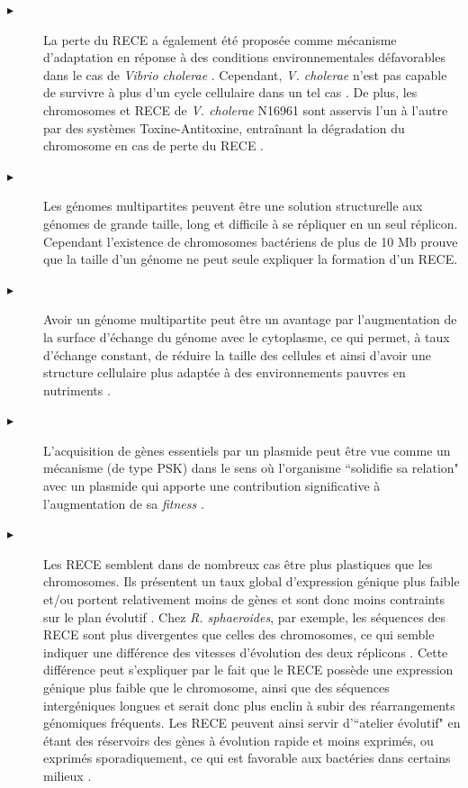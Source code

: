 \begin{description}
	\item[$\blacktriangleright$] La perte du RECE a également été proposée comme mécanisme d'adaptation en réponse à des conditions environnementales défavorables dans le cas de \textit{Vibrio cholerae} \citep{Heidelberg2000}. Cependant, \textit{V. cholerae} n'est pas capable de survivre à plus d'un cycle cellulaire dans un tel cas \citep{yamaichi2007genes}. De plus, les chromosomes et RECE de \textit{V. cholerae} N16961 sont asservis l'un à l'autre par des systèmes Toxine-Antitoxine, entraînant la dégradation du chromosome en cas de perte du RECE \citep{yuan2011three}.
	\item[$\blacktriangleright$] Les génomes multipartites peuvent être une solution structurelle aux génomes de grande taille, long et difficile à se répliquer en un seul réplicon. Cependant l'existence de chromosomes bactériens de plus de 10 Mb prouve que la taille d'un génome ne peut seule expliquer la formation d'un RECE.
	\item[$\blacktriangleright$] Avoir un génome multipartite peut être un avantage par l'augmentation de la surface d'échange du génome avec le cytoplasme, ce qui permet, à taux d'échange constant, de réduire la taille des cellules et ainsi d'avoir une structure cellulaire plus adaptée à des environnements pauvres en nutriments \citep{morita1988bioavailability,stouthamer1993pays}.
	\item[$\blacktriangleright$] L'acquisition de gènes essentiels par un plasmide peut être vue comme un mécanisme (de type PSK) dans le sens où l'organisme ``solidifie sa relation" avec un plasmide qui apporte une contribution significative à l'augmentation de sa \textit{fitness} \citep{Slater2009}. 
	\item[$\blacktriangleright$] Les RECE semblent dans de nombreux cas être plus plastiques que les chromosomes. Ils présentent un taux global d'expression génique plus faible et/ou portent relativement moins de gènes et sont donc moins contraints sur le plan évolutif \citep{White1999,Choudhary2004}. Chez \textit{R. sphaeroides}, par exemple, les séquences des RECE sont plus divergentes que celles des chromosomes, ce qui semble indiquer une différence des vitesses d'évolution des deux réplicons \citep{Choudhary2007}. Cette différence peut s'expliquer par le fait que le RECE possède une expression génique plus faible que le chromosome, ainsi que des séquences intergéniques longues et serait donc plus enclin à subir des réarrangements génomiques fréquents. Les RECE peuvent ainsi servir d'``atelier évolutif" en étant des réservoirs des gènes à évolution rapide et moins exprimés, ou exprimés sporadiquement, ce qui est favorable aux bactéries dans certains milieux \citep{morrow2012evolutionary,Cooper2010,Bavishi2010,galardini2013replicon}.

\end{description}
